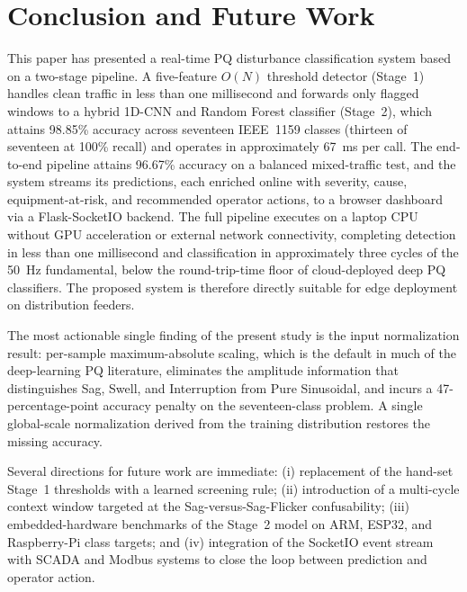 \documentclass[conference]{IEEEtran}
\begin{document}
\section{Conclusion and Future Work}\label{sec:conclusion}
This paper has presented a real-time PQ disturbance classification
system based on a two-stage pipeline. A five-feature $O(N)$ threshold
detector (Stage~1) handles clean traffic in less than one millisecond
and forwards only flagged windows to a hybrid 1D-CNN and Random
Forest classifier (Stage~2), which attains 98.85\% accuracy across
seventeen IEEE~1159 classes (thirteen of seventeen at 100\% recall)
and operates in approximately 67~ms per call. The end-to-end pipeline
attains 96.67\% accuracy on a balanced mixed-traffic test, and the
system streams its predictions, each enriched online with severity,
cause, equipment-at-risk, and recommended operator actions, to a
browser dashboard via a Flask-SocketIO backend. The full pipeline
executes on a laptop CPU without GPU acceleration or external network
connectivity, completing detection in less than one millisecond and
classification in approximately three cycles of the 50~Hz fundamental,
below the round-trip-time floor of cloud-deployed deep PQ classifiers.
The proposed system is therefore directly suitable for edge deployment
on distribution feeders.

The most actionable single finding of the present study is the input
normalization result: per-sample maximum-absolute scaling, which is
the default in much of the deep-learning PQ literature, eliminates
the amplitude information that distinguishes Sag, Swell, and
Interruption from Pure Sinusoidal, and incurs a 47-percentage-point
accuracy penalty on the seventeen-class problem. A single global-scale
normalization derived from the training distribution restores the
missing accuracy.

Several directions for future work are immediate: (i) replacement of
the hand-set Stage~1 thresholds with a learned screening rule;
(ii) introduction of a multi-cycle context window targeted at the
Sag-versus-Sag-Flicker confusability; (iii) embedded-hardware
benchmarks of the Stage~2 model on ARM, ESP32, and Raspberry-Pi
class targets; and (iv) integration of the SocketIO event stream
with SCADA and Modbus systems to close the loop between prediction
and operator action.



\end{document}
